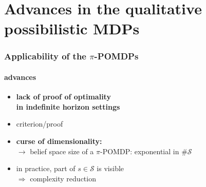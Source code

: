 \documentclass[12pt,svgnames,table]{beamer}
\begin{document}
\section[advances in $\pi$-POMDP]{Advances in the qualitative possibilistic MDPs}%
\begin{frame}
\frametitle{Applicability of the $\pi$-POMDPs}
\framesubtitle{\footnotesize advances}
\vspace{0.2cm}
\begin{itemize}
\item<alert@+> \textbf{lack of proof of optimality\\ 
in indefinite horizon settings}
\item criterion/proof
\end{itemize}
\vspace{0.4cm}
\begin{itemize}
\item<alert@+> \textbf{curse of dimensionality:} \\
$\rightarrow$ belief space size of a $\pi$-POMDP:  exponential in $\# \mathcal{S}$\\
\item in practice, part of $s \in \mathcal{S}$ is visible\\
\hspace{1.7cm} $\Rightarrow$ complexity reduction  
\end{itemize}
\vspace{0.5cm}



\end{frame}
\end{document}
